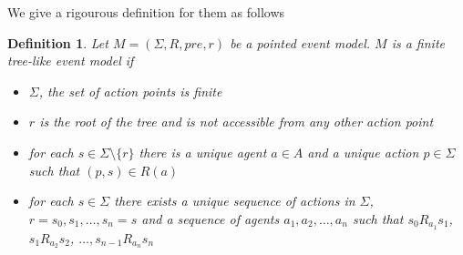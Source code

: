 \documentclass[12pt, a4paper, titlepage]{scrartcl}
\newtheorem{defn}{Definition}
\begin{document}
We give a rigourous definition for them as follows

\begin{defn} \label{finTree}
Let $M = (\Sigma, R, pre, r)$ be a pointed event model.
$M$ is a finite tree-like event model if
\begin{itemize}
	\item $\Sigma$, the set of action points is finite
	\item $r$ is the root of the tree and is not accessible from any other action point
	\item for each $s \in \Sigma \setminus \{ r \}$ there is a unique agent $a \in A$ and a unique
	action $p \in \Sigma$ such that $(p,s) \in R(a)$
	\item for each $s \in \Sigma$ there exists a unique sequence of actions in $\Sigma$, $r = s_0,
	s_1, \ldots, s_n = s$ and a sequence of agents $a_1, a_2, \ldots, a_n$ such that $s_0 R_{a_1}
	s_1$, $s_1 R_{a_2} s_2$, $\ldots, s_{n-1} R_{a_n} s_n$
\end{itemize}
\end{defn}
\end{document}
